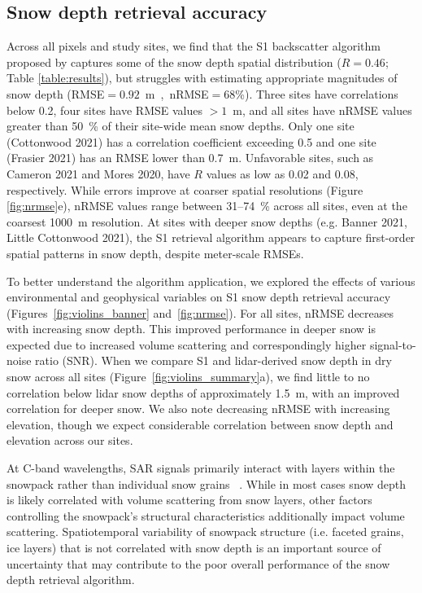 \documentclass[journal abbreviation, manuscript]{copernicus}
\begin{document}
\subsection{Snow depth retrieval accuracy}


Across all pixels and study sites, we find that the S1 backscatter algorithm proposed by \citet{Lievens.2022} captures some of the snow depth spatial distribution ($R=0.46$; Table \ref{table:results}), but struggles with estimating appropriate magnitudes of snow depth (RMSE$=0.92$~\unit~{m}, nRMSE$=68$\%). Three sites have correlations below 0.2, four sites have RMSE values $>1$~m, and all sites have nRMSE values greater than 50~\% of their site-wide mean snow depths. Only one site (Cottonwood 2021) has a correlation coefficient exceeding 0.5 and one site (Frasier 2021) has an RMSE lower than 0.7~m. Unfavorable sites, such as Cameron 2021 and Mores 2020, have $R$ values as low as 0.02 and 0.08, respectively. While errors improve at coarser spatial resolutions (Figure \ref{fig:nrmse}e), nRMSE values range between 31--74~\% across all sites, even at the coarsest 1000~m resolution. At sites with deeper snow depths (e.g. Banner 2021, Little Cottonwood 2021), the S1 retrieval algorithm appears to capture first-order spatial patterns in snow depth, despite meter-scale RMSEs. 

To better understand the algorithm application, we explored the effects of various environmental and geophysical variables on S1 snow depth retrieval accuracy (Figures~\ref{fig:violins_banner} and~\ref{fig:nrmse}). For all sites, nRMSE decreases with increasing snow depth. This improved performance in deeper snow is expected due to increased volume scattering and correspondingly higher signal-to-noise ratio (SNR). When we compare S1 and lidar-derived snow depth in dry snow across all sites (Figure~\ref{fig:violins_summary}a), we find little to no correlation below lidar snow depths of approximately 1.5~m, with an improved correlation for deeper snow. We also note decreasing nRMSE with increasing elevation, though we expect considerable correlation between snow depth and elevation across our sites. 

At C-band wavelengths, SAR signals primarily interact with layers within the snowpack rather than individual snow grains ~\citep{Naderpour.2022, Tsang.2022}. While in most cases snow depth is likely correlated with volume scattering from snow layers, other factors controlling the snowpack's structural characteristics additionally impact volume scattering. Spatiotemporal variability of snowpack structure (i.e. faceted grains, ice layers) that is not correlated with snow depth is an important source of uncertainty that may contribute to the poor overall performance of the snow depth retrieval algorithm. 
\end{document}

